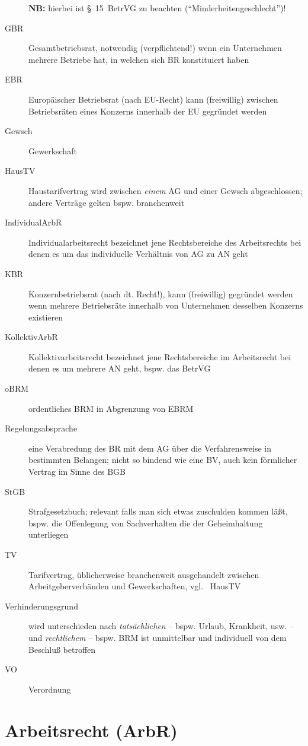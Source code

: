 \documentclass[version=last,paper=A4,fontsize=11pt,DIV=18]{scrartcl}
\begin{document}
\begin{description}
	\textbf{NB:} hierbei ist \S~15~BetrVG zu beachten (\enquote{Minderheitengeschlecht})!
	\item[GBR] Gesamtbetriebsrat, notwendig (verpflichtend!) wenn ein Unternehmen mehrere Betriebe hat, in welchen sich BR konstituiert haben
	\item[EBR] Europäischer Betriebsrat (nach EU-Recht) kann (freiwillig) zwischen Betriebsräten eines Konzerns innerhalb der EU gegründet werden
	\item[Gewsch] Gewerkschaft
	\item[HausTV] Haustarifvertrag wird zwischen \emph{einem} AG und einer Gewsch abgeschlossen; andere Verträge gelten bspw. branchenweit
	\item[IndividualArbR] Individualarbeitsrecht bezeichnet jene Rechtsbereiche des Arbeitsrechts bei denen es um das individuelle Verhältnis von AG zu AN geht
	\item[KBR] Konzernbetriebsrat (nach dt. Recht!), kann (freiwillig) gegründet werden wenn mehrere Betriebsräte innerhalb von Unternehmen desselben Konzerns existieren
	\item[KollektivArbR] Kollektivarbeitsrecht bezeichnet jene Rechtsbereiche im Arbeitsrecht bei denen es um mehrere AN geht, bspw. das BetrVG
	\item[oBRM] ordentliches BRM in Abgrenzung von EBRM
	\item[Regelungsabsprache] eine Verabredung des BR mit dem AG über die Verfahrensweise in bestimmten Belangen; nicht so bindend wie eine BV, auch kein förmlicher Vertrag im Sinne des BGB
	\item[StGB] Strafgesetzbuch; relevant falls man sich etwas zuschulden kommen läßt, bspw. die Offenlegung von Sachverhalten die der Geheimhaltung unterliegen
	\item[TV] Tarifvertrag, üblicherweise branchenweit ausgehandelt zwischen Arbeitgeberverbänden und Gewerkschaften, vgl. ~HausTV
	\item[Verhinderungsgrund] wird unterschieden nach \emph{tatsächlichen} -- bspw. Urlaub, Krankheit, usw. -- und \emph{rechtlichem} -- bspw. BRM ist unmittelbar und individuell von dem Beschluß betroffen
	\item[VO] Verordnung
\end{description}

\section*{Arbeitsrecht (ArbR)}
\end{document}
